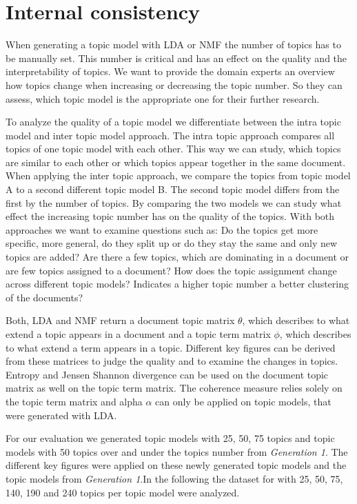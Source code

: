 \newpage
\section{Internal consistency}
\label{Internal_consistency}
When generating a topic model with \ac{LDA} or \ac{NMF} the number of topics has to be manually set. This number is critical and has an effect on the quality and the interpretability of topics. We want to provide the domain experts an overview how topics change when increasing or decreasing the topic number. So they can assess, which topic model is the appropriate one for their further research. 

To analyze the quality of a topic model we differentiate between the intra topic model and inter topic model approach. The intra topic approach compares all topics of one topic model with each other. This way we can study, which topics are similar to each other or which topics appear together in the same document. When applying the inter topic approach, we compare the topics from topic model A to a second different topic model B. The second topic model differs from the first by the number of topics. By comparing the two models we can study what effect the increasing topic number has on the quality of the topics. With both approaches we want to examine questions such as: Do the topics get more specific, more general, do they split up or do they stay the same and only new topics are added? Are there a few topics, which are dominating in a document or are few topics assigned to a document? How does the topic assignment change across different topic models? Indicates a higher topic number a better clustering of the documents?

Both, \ac{LDA} and \ac{NMF} return a document topic matrix $\theta$, which describes to what extend a topic appears in a document and a topic term matrix $\phi$, which describes to what extend a term appears in a topic. Different key figures can be derived from these matrices to judge the quality and to examine the changes in topics.
Entropy and Jensen Shannon divergence can be used on the document topic matrix as well on the topic term matrix. The coherence measure relies solely on the topic term matrix and alpha $\alpha$  can only be applied on topic models, that were generated with \ac{LDA}.

For our evaluation we generated topic models with 25, 50, 75 topics and topic models with 50 topics over and under the topics number from \textit{Generation 1}. The different key figures were applied on these newly generated topic models and the topic models from \textit{Generation 1}.In the following the dataset for  with 25, 50, 75, 140, 190 and 240 topics per topic model were analyzed.

